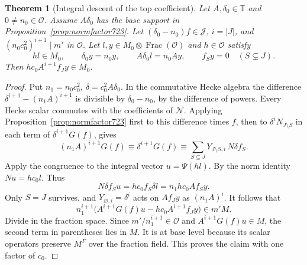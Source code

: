 \documentclass[a4paper,11pt]{article}
\newtheorem{theorem}[proposition]{Theorem}
\theoremstyle{definition}
\theoremstyle{remark}
\numberwithin{equation}{section}
\begin{document}
\begin{theorem}[Integral descent of the top coefficient]
\leavevmode\label{thm:topdescent723}
Let \(A,\delta_0\in\mathbb T\) and \(0\ne n_0\in\mathcal O\).
Assume \(A\delta_0\) has the base support in
Proposition~\ref{prop:normfactor723}. Let
\((\delta_0-n_0)f\in\mathcal J\), \(i=|J|\), and
\((n_0c_0^2)^{i+1}\mid m'\) in \(\mathcal O\).
Let \(l,y\in M_0\otimes\operatorname{Frac}(\mathcal O)\)
and \(h\in\mathcal O\) satisfy
\[
        h l\in M_0,\qquad \delta_0y=n_0y,\qquad
        A\delta_0l=n_0Ay,\qquad
        f_S y=0\quad(S\subsetneq J).
\]
Then \(h c_0 A^{i+1} f_J y\in M_0\).
\end{theorem}
\begin{proof}
Put \(n_1=n_0c_0^2,\ \delta=c_0^2 A\delta_0\).
In the commutative Hecke algebra the difference
\(\delta^{i+1}-(n_1A)^{i+1}\) is divisible by
\(\delta_0-n_0\), by the difference of powers. Every Hecke
scalar commutes with the coefficients of \(\mathcal N\).
Applying Proposition~\ref{prop:normfactor723} first to this
difference times \(f\), then to \(\delta^iN_{J\setminus S}\)
in each term of \(\delta^{i+1}G(f)\), gives
\[
   (n_1A)^{i+1}G(f)\equiv\delta^{i+1}G(f)
        \equiv\sum_{S\subseteq J}Y_{J\setminus S,i}\,N\delta f_S .
\]
Apply the congruence to the integral vector \(u=\Psi(h l)\).
By the norm identity \(Nu=h c_0 l\). Thus
\[
       N\delta f_S u=h c_0 f_S\delta l
                      =n_1 h c_0 A f_S y.
\]
Only \(S=J\) survives, and \(Y_{\varnothing,i}=\delta^i\)
acts on \(A f_J y\) as \((n_1 A)^i\). It follows that
\[
 n_1^{i+1}\bigl(A^{i+1}G(f)u-hc_0 A^{i+1}f_J y\bigr)
       \in m'M .
\]
Divide in the fraction space. Since \(m'/n_1^{i+1}\in\mathcal O\)
and \(A^{i+1}G(f)u\in M\), the second term in parentheses
lies in \(M\). It is at base level because its scalar operators
preserve \(M^\Gamma\) over the fraction field. This proves the
claim with one factor of \(c_0\).
\end{proof}
\end{document}
